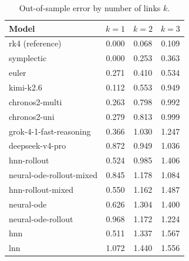 \documentclass{article}
\begin{document}
\begin{table}[tbp]
\centering\small
\caption{Out-of-sample error by number of links $k$.}
\label{tab:perk}
\begin{tabular}{lccc}
\toprule
Model & $k{=}1$ & $k{=}2$ & $k{=}3$ \\
\midrule
rk4 (reference) & 0.000 & 0.068 & 0.109 \\
symplectic & 0.000 & 0.253 & 0.363 \\
euler & 0.271 & 0.410 & 0.534 \\
kimi-k2.6 & 0.112 & 0.553 & 0.949 \\
chronos2-multi & 0.263 & 0.798 & 0.992 \\
chronos2-uni & 0.279 & 0.813 & 0.999 \\
grok-4-1-fast-reasoning & 0.366 & 1.030 & 1.247 \\
deepseek-v4-pro & 0.872 & 0.949 & 1.036 \\
hnn-rollout & 0.524 & 0.985 & 1.406 \\
neural-ode-rollout-mixed & 0.845 & 1.178 & 1.084 \\
hnn-rollout-mixed & 0.550 & 1.162 & 1.487 \\
neural-ode & 0.626 & 1.304 & 1.400 \\
neural-ode-rollout & 0.968 & 1.172 & 1.224 \\
hnn & 0.511 & 1.337 & 1.567 \\
lnn & 1.072 & 1.440 & 1.556 \\
\bottomrule
\end{tabular}
\end{table}
\end{document}
